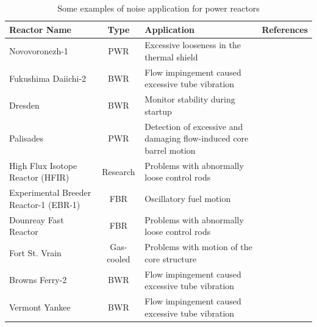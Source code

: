 \begin{table}[h]
        \centering
        \caption{Some examples of noise application for power reactors}
        \begin{tabular}{ | m{3.5cm} |c| m{7cm} |c| } 
         \hline
         \textbf{Reactor Name} & \textbf{Type} & \textbf{Application}& \textbf{References} \\ 
         \hline
         Novovoronezh-1 & PWR &  Excessive looseness in the thermal shield & \cite{thiePowerReactorNoise1981} \\ 
         \hline
         Fukushima Daiichi-2 & BWR & Flow impingement caused excessive tube vibration & \cite{behringerObservationIncoreInstrument1977, mathisCharacterizationStudiesBWR41977}\\ 
         \hline
         Dresden & BWR & Monitor stability during startup & \cite{thieElementaryMethodsReactor1963} \\ 
         \hline
         Palisades & PWR & Detection of excessive and damaging flow-induced core barrel motion & \cite{fryAnalysisNeutrondensityOscillations1975} \\ 
         \hline
         High Flux Isotope Reactor (HFIR) & Research & Problems with abnormally loose control rods & \cite{behringerObservationIncoreInstrument1977, mathisCharacterizationStudiesBWR41977}\\ 
         \hline
         Experimental Breeder Reactor-1 (EBR-1) & FBR & Oscillatory fuel motion & \cite{thiePowerReactorNoise1981} \\ 
         \hline
         Dounreay Fast Reactor & FBR & Problems with abnormally loose control rods & \cite{barclayDevelopmentNoiseAnalysis1977} \\ 
         \hline
         Fort St. Vrain & Gas-cooled & Problems with motion of the core structure & \cite{thiePowerReactorNoise1981} \\ 
         \hline
         Browns Ferry-2 & BWR & Flow impingement caused excessive tube vibration & \cite{behringerObservationIncoreInstrument1977, mathisCharacterizationStudiesBWR41977} \\ 
         \hline
         Vermont Yankee & BWR & Flow impingement caused excessive tube vibration & \cite{behringerObservationIncoreInstrument1977, mathisCharacterizationStudiesBWR41977} \\ 
         \hline
        \end{tabular}
        \label{table:diagnostics}
\end{table}


